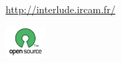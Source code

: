 \begin{frame}
	\frametitle{}	
	\begin{center}
	
	\bigskip
	{\color[rgb]{0.5,0,0}{\Huge INScore} \\ 
	\vspace{5mm}
	{\LARGE{}}} \\
	\href{http://interlude.ircam.fr/}{http://interlude.ircam.fr/}
	
	\bigskip
	\bigskip
	\includegraphics[width=15mm]{imgs/opensource} \\
	\end{center}
	
\end{frame}






